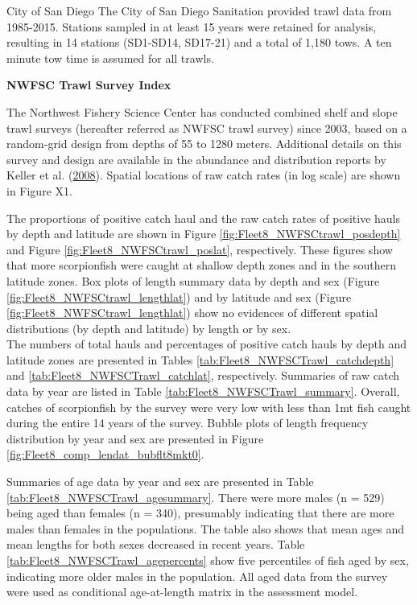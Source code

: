 \documentclass[12pt,]{article}
\begin{document}
City of San Diego The City of San Diego Sanitation provided trawl data
from 1985-2015. Stations sampled in at least 15 years were retained for
analysis, resulting in 14 stations (SD1-SD14, SD17-21) and a total of
1,180 tows. A ten minute tow time is assumed for all trawls.

\textbf{NWFSC Trawl Survey Index}

The Northwest Fishery Science Center has conducted combined shelf and
slope trawl surveys (hereafter referred as NWFSC trawl survey) since
2003, based on a random-grid design from depths of 55 to 1280 meters.
Additional details on this survey and design are available in the
abundance and distribution reports by Keller et al.
(\protect\hyperlink{ref-Keller2008}{2008}). Spatial locations of raw
catch rates (in log scale) are shown in Figure X1.

The proportions of positive catch haul and the raw catch rates of
positive hauls by depth and latitude are shown in Figure
\ref{fig:Fleet8_NWFSCtrawl_posdepth} and Figure
\ref{fig:Fleet8_NWFSCtrawl_poslat}, respectively. These figures show
that more scorpionfish were caught at shallow depth zones and in the
southern latitude zones. Box plots of length summary data by depth and
sex (Figure \ref{fig:Fleet8_NWFSCtrawl_lengthlat}) and by latitude and
sex (Figure \ref{fig:Fleet8_NWFSCtrawl_lengthlat}) show no evidences of
different spatial distributions (by depth and latitude) by length or by
sex.\\
The numbers of total hauls and percentages of positive catch hauls by
depth and latitude zones are presented in Tables
\ref{tab:Fleet8_NWFSCTrawl_catchdepth} and
\ref{tab:Fleet8_NWFSCTrawl_catchlat}, respectively. Summaries of raw
catch data by year are listed in Table
\ref{tab:Fleet8_NWFSCTrawl_summary}. Overall, catches of scorpionfish by
the survey were very low with less than 1mt fish caught during the
entire 14 years of the survey. Bubble plots of length frequency
distribution by year and sex are presented in Figure
\ref{fig:Fleet8_comp_lendat_bubflt8mkt0}.

Summaries of age data by year and sex are presented in Table
\ref{tab:Fleet8_NWFSCTrawl_agesummary}. There were more males (n = 529)
being aged than females (n = 340), presumably indicating that there are
more males than females in the populations. The table also shows that
mean ages and mean lengths for both sexes decreased in recent years.
Table \ref{tab:Fleet8_NWFSCTrawl_agepercents} show five percentiles of
fish aged by sex, indicating more older males in the population. All
aged data from the survey were used as conditional age-at-length matrix
in the assessment model.
\end{document}

